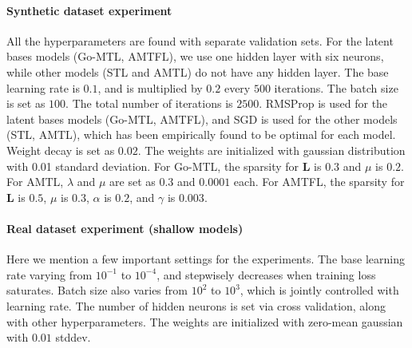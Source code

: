 \documentclass{article}
\newcommand{\mat}[1]{\boldsymbol{#1}} %
\begin{document}
\paragraph {Synthetic dataset experiment}
All the hyperparameters are found with separate validation sets. For the latent bases models (Go-MTL, AMTFL), we use one hidden layer with six neurons, while other models (STL and AMTL) do not have any hidden layer. The base learning rate is $0.1$, and is multiplied by $0.2$ every $500$ iterations. The batch size is set as $100$. The total number of iterations is $2500$. RMSProp is used for the latent bases models (Go-MTL, AMTFL), and SGD is used for the other models (STL, AMTL), which has been empirically found to be optimal for each model. Weight decay is set as $0.02$. The weights are initialized with gaussian distribution with 0.01 standard deviation. For Go-MTL, the sparsity for $\mat{L}$ is $0.3$ and $\mu$ is $0.2$. For AMTL, $\lambda$ and $\mu$ are set as $0.3$ and $0.0001$ each. For AMTFL, the sparsity for $\mat{L}$ is $0.5$, $\mu$ is $0.3$, $\alpha$ is $0.2$, and $\gamma$ is $0.003$.

\vspace{-0.1in}
\paragraph {Real dataset experiment (shallow models)}
Here we mention a few important settings for the experiments. The base learning rate varying from $10^{-1}$ to $10^{-4}$, and stepwisely decreases when training loss saturates. Batch size also varies from $10^2$ to $10^3$, which is jointly controlled with learning rate. The number of hidden neurons is set via cross validation, along with other hyperparameters. The weights are initialized with zero-mean gaussian with $0.01$ stddev.

\vspace{-0.1in}
\end{document}
